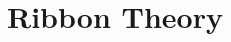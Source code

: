 \documentclass{article}
\newtheorem{corollary}[theorem]{Corollary}
\theoremstyle{definition}
\begin{document}
%
%
%
%
%
%
%




\newpage
\section{Ribbon Theory}
\end{document}
